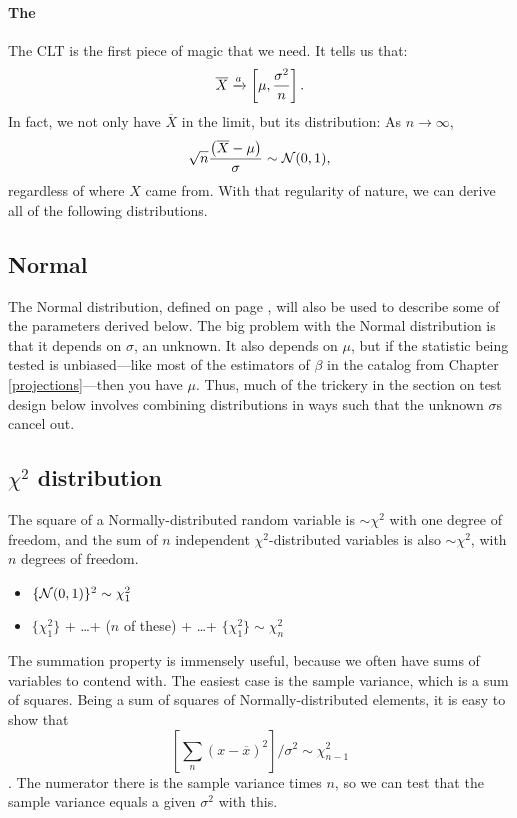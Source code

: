 \paragraph{The } The CLT is the first piece of magic
that we need. It tells us that:
$$\overline X \xrightarrow{a} \left[\mu,{\sigma^2\over n}\right].$$
In fact, we not only have $\overline X$ in the limit, but its distribution:
As $n\to \infty$, $$\sqrt{n} \frac{\left(\overline X - \mu\right)}{\sigma} \sim {\cal N}(0,1),$$ 
regardless of where $X$ came from. With that regularity of nature,
we can derive all of the following distributions.  \label{CLT}

\subsection{Normal} 

The Normal distribution, defined on page \pageref{normal},
will also be used to describe some of the parameters derived below.
The big problem with the Normal distribution is that it depends on $\sigma$, an
unknown. It also depends on $\mu$, but if the statistic
being tested is unbiased---like most of the estimators of $\beta$ in the
catalog from Chapter \ref{projections}---then you have $\mu$. Thus, much of the trickery in the
section on test design below involves combining distributions in ways
such that the unknown $\sigma$s cancel out.

\subsection{$\chi^2$ distribution} 
The square of a Normally-distributed random variable is $\sim \chi^2$
with one degree of freedom, and the sum of $n$ independent
$\chi^2$-distributed variables is also $\sim \chi^2$, with $n$ degrees
of freedom.

\begin{itemize}
\item $\{{\cal N} (0,1)\}^2 \sim \chi^2_1$

\item $\{\chi^2_1\}$ + \dots + ($n$ of these) + \dots + $\{\chi^2_1\} \sim \chi^2_n$
\end{itemize}			\label{chisq}

The summation property is immensely useful, because we often have sums
of variables to contend with. The easiest case is the sample variance,
which is a sum of squares. Being a sum of squares of Normally-distributed
elements, it is easy to show that 
\begin{equation}\label{chisqvar}
[\sum_n (x-\overline x)^2]/\sigma^2\sim \chi^2_{n-1} 
\end{equation}
. The numerator there is the sample variance times $n$, so
we can test that the sample variance equals a given $\sigma^2$ with this.


